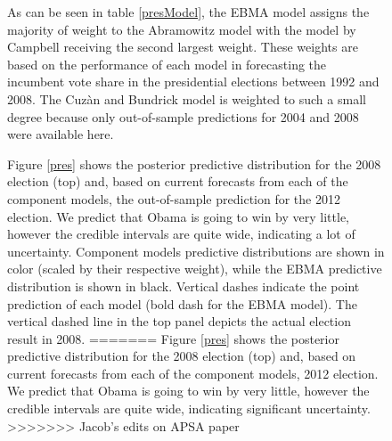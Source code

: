 \documentclass[12pt,fullpage,endnotes]{article}
\begin{document}
\begin{figure}[h]
As can be seen in table \ref{presModel}, the EBMA model assigns the majority of weight to the Abramowitz model with the model by Campbell receiving the second largest weight. These weights are based on the performance of each model in forecasting the incumbent vote share in the presidential elections between 1992 and 2008. The Cuz\`an and Bundrick model is weighted to such a small degree because only out-of-sample predictions for 2004 and 2008 were available here.

Figure \ref{pres} shows the posterior predictive distribution for the
2008 election (top) and, based on current forecasts from each of the
component models, the out-of-sample prediction for the 2012 election.  We predict that Obama is going to
win by very little, however the credible intervals are quite wide, indicating a lot of uncertainty. Component models predictive distributions are shown in color (scaled by their respective weight), while the EBMA predictive distribution is shown in black. Vertical dashes indicate the point prediction of each model (bold dash for the EBMA model). The vertical dashed line in the top panel depicts the actual election result in 2008.
=======
Figure \ref{pres} shows the posterior predictive distribution for the
2008 election (top) and, based on current forecasts from each of the
component models, 2012 election.  We predict that Obama is going to
win by very little, however the credible intervals are quite wide,
indicating significant uncertainty.
>>>>>>> Jacob's edits on APSA paper


\end{figure}
\end{document}
